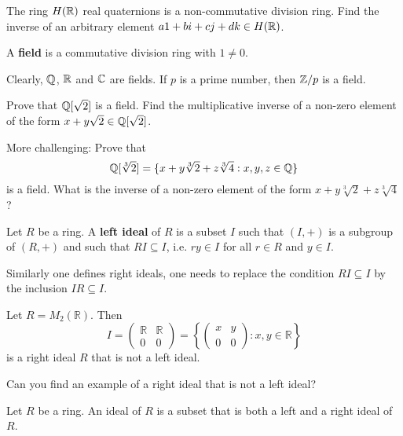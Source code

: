 The ring $H(\mathbb{R})$ real quaternions is a non-commutative division ring. Find the inverse of
an arbitrary element $a1+bi+cj+dk\in H(\mathbb{R})$. 

\begin{definition}
	A \textbf{field} is a commutative division ring with $1\ne 0$. 
\end{definition}

Clearly, $\mathbb{Q}$, $\mathbb{R}$ and $\mathbb{C}$ are fields. 
If $p$ is a prime number, then $\mathbb{Z}/p$ is a field. 	

\begin{exercise}
	Prove that $\mathbb{Q}[\sqrt{2}]$ is a field. 
	Find the multiplicative inverse of a non-zero element of the form 
	$x+y\sqrt{2}\in\mathbb{Q}[\sqrt{2}]$.  
\end{exercise}

More challenging: Prove that 
\[
\mathbb{Q}[\sqrt[3]{2}]=\{x+y\sqrt[3]{2}+z\sqrt[3]{4}:x,y,z\in\mathbb{Q}\}
\]
is a field. What is the inverse of a non-zero element of the form $x+y\sqrt[3]{2}+z\sqrt[3]{4}$?

\begin{definition}
	Let $R$ be a ring. A \textbf{left ideal} of $R$ is a subset $I$ such that 
	$(I,+)$ is a subgroup of $(R,+)$ and such that $RI\subseteq I$, 
	i.e. $ry\in I$ for all $r\in R$ and $y\in I$. 
\end{definition}

Similarly one defines right ideals, one needs 
to replace the condition $RI\subseteq I$ by 
the inclusion 
$IR\subseteq I$. 

\begin{example}
Let $R=M_{2}(\mathbb{R})$. Then   
\[
I=\left(\begin{array}{cc}
\mathbb{R} & \mathbb{R}\\
0 & 0
\end{array}\right)=\left\{ \left(\begin{array}{cc}
x & y\\
0 & 0
\end{array}\right):x,y\in\mathbb{R}\right\} 
\]
is a right ideal $R$ that is not a left ideal. 
\end{example}

Can you find an 
example of a right ideal that is not a left ideal?

\begin{definition}
Let $R$ be a ring. An ideal of $R$ is a subset that is both a left and a right ideal of $R$. 
\end{definition}
 
